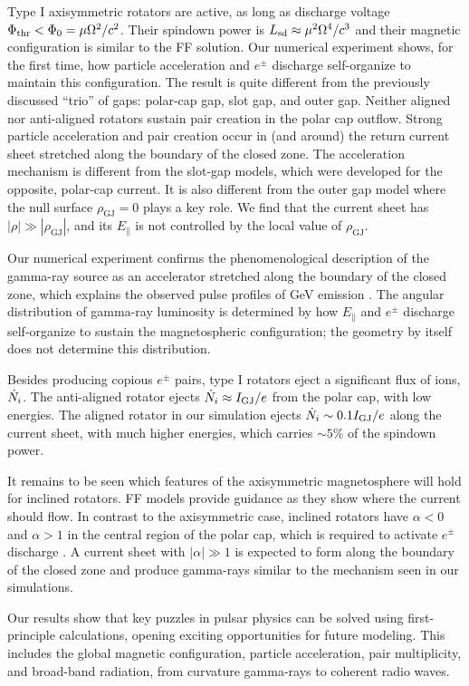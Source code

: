 Type I axisymmetric rotators are active, as long as discharge voltage
$\Phi_{\rm thr}<\Phi_0=\mu\Omega^2/c^2$.
Their spindown power is $L_{\rm sd}\approx \mu^2\Omega^4/c^3$
and their magnetic configuration is similar to the FF solution.
Our numerical experiment shows, for the first time,
how particle acceleration and $e^\pm$ discharge
self-organize to maintain this configuration.
The result is quite different from the
previously discussed ``trio'' of gaps: polar-cap gap, slot gap, and outer gap.
Neither aligned nor anti-aligned rotators sustain pair creation
in the polar cap outflow.
Strong particle acceleration and pair creation occur in (and around)
the return current sheet
stretched along the boundary of the closed zone.
The acceleration mechanism is different from
the slot-gap models, which were developed for the opposite,
polar-cap current. It is also different from the outer gap model where
the null surface $\rho_\mathrm{GJ}=0$ plays a key role.
We find that the current sheet has
$|\rho|\gg|\rho_\mathrm{GJ}|$, and its $E_\parallel$ is not controlled by the
local value of $\rho_\mathrm{GJ}$.

Our numerical experiment confirms the phenomenological description of the
gamma-ray source as an accelerator stretched along the boundary of the closed
zone, which explains the observed pulse profiles of GeV emission
\citep{dyks_two-pole_2003}.
The angular distribution of gamma-ray luminosity is determined by
how $E_\parallel$ and $e^\pm$ discharge self-organize to sustain the magnetospheric
configuration; the geometry by itself does not determine this distribution.

Besides producing copious $e^\pm$ pairs, type I rotators eject a significant flux
of ions, $\dot{N}_i$. The anti-aligned rotator ejects $\dot{N}_i\approx I_\mathrm{GJ}/e$
from the polar cap, with low energies. The aligned rotator in our simulation ejects
$\dot{N}_i\sim 0.1I_\mathrm{GJ}/e$ along the current sheet, with much higher energies, which
carries $\sim 5$\% of the spindown power.

It remains to be seen which features of the axisymmetric magnetosphere
will hold for inclined rotators.
FF models provide guidance as they show where the current should
flow. In contrast to the axisymmetric case, inclined rotators have $\alpha<0$ and
$\alpha>1$ in the central region of the polar cap, which is required to activate
$e^\pm$ discharge
\citep{beloborodov_polar-cap_2008,chen_dead_2013,timokhin_current_2013}.
A current sheet with $|\alpha|\gg 1$ is expected to form along the boundary of
the closed zone and produce gamma-rays similar to the mechanism seen in our
simulations.

Our results show that key puzzles in pulsar physics
can be solved using first-principle calculations, opening exciting opportunities
for future modeling. This includes the global magnetic configuration, particle
acceleration,
pair multiplicity, and broad-band radiation, from
curvature gamma-rays to coherent radio waves.

